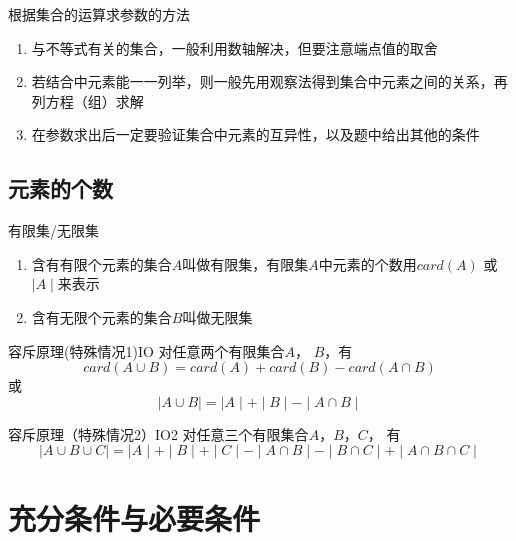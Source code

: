\begin{note}{根据集合的运算求参数的方法}
	\begin{enumerate}
		\item 与不等式有关的集合，一般利用数轴解决，但要注意端点值的取舍
		\item 若结合中元素能一一列举，则一般先用观察法得到集合中元素之间的关系，再列方程（组）求解
		\item 在参数求出后一定要验证集合中元素的互异性，以及题中给出其他的条件
	\end{enumerate}
\end{note}

\subsection{元素的个数}

\begin{definition}{有限集/无限集}{}
	\begin{enumerate}
		\item 含有\textcolor{third}{有限个元素}的集合$A$叫做\textcolor{third}{有限集}，有限集$A$中元素的个数用$card\left(A\right)$ 或 $\mid A \mid$来表示
		\item 含有\textcolor{third}{无限个元素}的集合$B$叫做\textcolor{third}{无限集}
	\end{enumerate}
\end{definition}

\begin{theorem}{容斥原理(特殊情况1)}{IO}
对任意两个有限集合$A$， $B$，有
\begin{equation}
card\left(A \cup B \right) = card\left(A\right) + card\left(B\right) - card\left(A \cap B \right)
\end{equation}
或
\begin{equation}
\mid A \cup B \mid = \mid A \mid + \mid B \mid - \mid A \cap B \mid
\end{equation}
\end{theorem}

\begin{theorem}{容斥原理（特殊情况2）}{IO2}
对任意三个有限集合$A$，$B$，$C$， 有
\begin{equation}
\mid A \cup B \cup C \mid = \mid A \mid + \mid B \mid + \mid C \mid - \mid A \cap B \mid - \mid B \cap C \mid + \mid A \cap B \cap C \mid
\end{equation}
\end{theorem}


\section{充分条件与必要条件}

